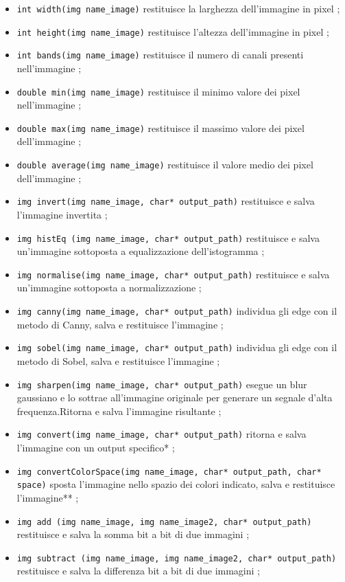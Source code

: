 \documentclass[10pt]{article}
\begin{document}
\begin{itemize}
\item \texttt{int width(img name\_image)} restituisce la larghezza dell’immagine in pixel ;
\item \texttt{int height(img name\_image)} restituisce l'altezza dell’immagine in pixel ;
\item \texttt{int bands(img name\_image)} restituisce il numero di canali presenti nell’immagine ;
\item \texttt{double min(img name\_image)} restituisce il minimo valore dei pixel nell’immagine ;
\item \texttt{double max(img name\_image)} restituisce il massimo valore dei pixel dell’immagine ;	
\item \texttt{double average(img name\_image)} restituisce il valore medio dei pixel dell’immagine ;
\item \texttt{img invert(img name\_image, char* output\_path)} restituisce e salva l'immagine invertita ;
\item \texttt{img histEq (img name\_image, char* output\_path)} restituisce e salva un’immagine sottoposta a equalizzazione dell’istogramma ;
\item \texttt{img normalise(img name\_image, char* output\_path)} restituisce e salva un’immagine sottoposta a normalizzazione ;
\item \texttt{img canny(img name\_image, char* output\_path)} individua gli edge con il metodo di Canny, salva e restituisce l’immagine ;
\item \texttt{img sobel(img name\_image, char* output\_path)} individua gli edge con il metodo di Sobel, salva e restituisce l’immagine ;
\item \texttt{img sharpen(img name\_image, char* output\_path)} esegue un blur gaussiano e lo sottrae all’immagine originale per generare un segnale d’alta frequenza.\newline Ritorna e salva l’immagine risultante ;
\item \texttt{img convert(img name\_image, char* output\_path)} ritorna e salva l’immagine con un output specifico* ;
\item \texttt{img convertColorSpace(img name\_image, char* output\_path, char* space)} sposta l'immagine nello spazio dei colori indicato, salva e restituisce l’immagine** ;
\item \texttt{img add (img name\_image, img name\_image2, char* output\_path)} restituisce e salva la somma bit a bit di due immagini ;
\item \texttt{img subtract (img name\_image, img name\_image2, char* output\_path)} restituisce e salva la differenza bit a bit di due immagini ;

\end{itemize}
\end{document}
